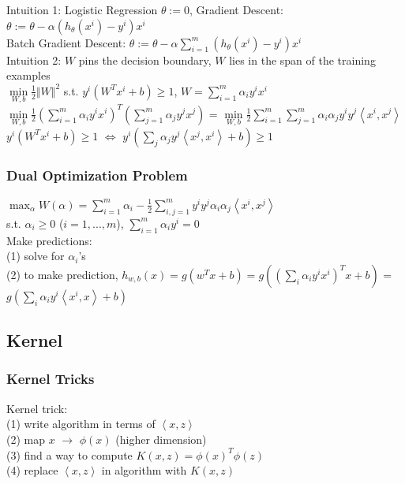 \documentclass{article}
\begin{document}
\noindent
Intuition 1: Logistic Regression
$\theta := 0$, Gradient Descent: $\theta := \theta - \alpha(h_\theta(x^i)-y^i)x^i$\\
\indent
Batch Gradient Descent: $\theta := \theta - \alpha\sum\limits_{i=1}^m(h_\theta(x^i)-y^i)x^i$\\

\noindent
Intuition 2: $W$ pins the decision boundary, $W$ lies in the span of the training examples\\

\noindent
$\min\limits_{W, b}\frac{1}{2} {\Vert W \Vert}^2$ s.t. $y^i(W^Tx^i+b) \geq 1$, $W = \sum\limits_{i=1}^m \alpha_iy^ix^i$\\
$\min\limits_{W, b}\frac{1}{2} {(\sum\limits_{i=1}^m \alpha_iy^ix^i)}^T(\sum\limits_{j=1}^m \alpha_jy^jx^j)$
= $\min\limits_{W, b}\frac{1}{2} \sum\limits_{i=1}^m \sum\limits_{j=1}^m \alpha_i\alpha_j y^iy^j \left< x^i,x^j \right>$\\
$y^i(W^Tx^i+b) \geq 1$ $\Leftrightarrow$ $y^i(\sum\limits_j\alpha_jy^j\left< x^j,x^i \right>+b) \geq 1$

\subsubsection{Dual Optimization Problem}
$\max_\alpha W(\alpha) = \sum\limits_{i=1}^m\alpha_i - \frac{1}{2}\sum\limits_{i,j=1}^my^iy^j\alpha_i\alpha_j\left< x^i,x^j \right>$\\
s.t. $\alpha_i \geq 0$ ($i = 1, ..., m$), $\sum\limits_{i=1}^m\alpha_iy^i=0$\\

\noindent
Make predictions:\\
(1) solve for $\alpha_i$'s\\
(2) to make prediction, $h_{w,b}(x) = g(w^Tx+b) = g({(\sum\limits_i \alpha_iy^ix^i)}^T x + b)$
= $g(\sum\limits_i \alpha_iy^i \left< x^i,x \right> + b)$

\subsection{Kernel}
\subsubsection{Kernel Tricks}
Kernel trick:\\
(1) write algorithm in terms of $\left< x,z \right>$\\
(2) map $x$ $\longrightarrow$ $\phi(x)$ (higher dimension)\\
(3) find a way to compute $K(x,z)={\phi(x)}^T\phi(z)$\\
(4) replace $\left< x,z \right>$ in algorithm with $K(x,z)$\\
\end{document}
